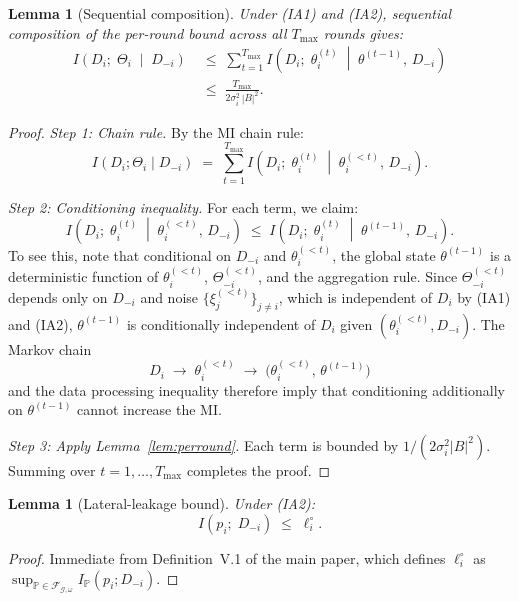 \documentclass[letterpaper,journal]{IEEEtran}
\newtheorem{lemma}[theorem]{Lemma}
\newcommand{\TOPO}{\mathcal{G}}
\newcommand{\FAM}{\mathcal{F}}
\newcommand{\Tmax}{T_{\max}}
\begin{document}
\begin{lemma}[Sequential composition]
\label{lem:composition}
Under (IA1) and (IA2), sequential composition of the per-round
bound across all $\Tmax$ rounds gives:
\begin{align*}
I\!\left(D_i;\;\Theta_i \;\middle|\; D_{-i}\right)
&\;\leq\;
\sum_{t=1}^{\Tmax}
I\!\left(D_i;\;\theta_i^{(t)} \;\middle|\;
\theta^{(t-1)},\,D_{-i}\right) \\
&\;\leq\;
\frac{\Tmax}{2\sigma_i^2\,|B|^2}.
\end{align*}
\end{lemma}

\begin{proof}
\textit{Step 1: Chain rule.} By the MI chain rule:
\[
I(D_i;\Theta_i \mid D_{-i})
\;=\; \sum_{t=1}^{\Tmax}
I\!\left(D_i;\;\theta_i^{(t)} \;\middle|\;
\theta_i^{(<t)},\,D_{-i}\right).
\]

\noindent\textit{Step 2: Conditioning inequality.}
For each term, we claim:
\[
I\!\left(D_i;\;\theta_i^{(t)} \;\middle|\;
\theta_i^{(<t)},\,D_{-i}\right)
\;\leq\;
I\!\left(D_i;\;\theta_i^{(t)} \;\middle|\;
\theta^{(t-1)},\,D_{-i}\right).
\]
To see this, note that conditional on $D_{-i}$ and
$\theta_i^{(<t)}$, the global state $\theta^{(t-1)}$ is a
deterministic function of $\theta_i^{(<t)}$,
$\Theta_{-i}^{(<t)}$, and the aggregation rule. Since
$\Theta_{-i}^{(<t)}$ depends only on $D_{-i}$ and noise
$\{\xi_j^{(<t)}\}_{j \neq i}$, which is independent of $D_i$
by (IA1) and (IA2), $\theta^{(t-1)}$ is conditionally
independent of $D_i$ given $(\theta_i^{(<t)}, D_{-i})$.
The Markov chain
\[
D_i \;\longrightarrow\; \theta_i^{(<t)}
\;\longrightarrow\;
\bigl(\theta_i^{(<t)},\,\theta^{(t-1)}\bigr)
\]
and the data processing inequality therefore imply that
conditioning additionally on $\theta^{(t-1)}$ cannot increase
the MI.

\medskip
\noindent\textit{Step 3: Apply Lemma~\ref{lem:perround}.}
Each term is bounded by $1/(2\sigma_i^2|B|^2)$. Summing
over $t = 1, \ldots, \Tmax$ completes the proof.
\end{proof}

\begin{lemma}[Lateral-leakage bound]
\label{lem:lateral}
Under (IA2):
\[
I\!\left(p_i;\;D_{-i}\right) \;\leq\; \ell_i^\circ.
\]
\end{lemma}

\begin{proof}
Immediate from Definition~V.1 of the main paper, which defines
$\ell_i^\circ$ as $\sup_{\mathbb{P} \in \FAM_{\TOPO,\omega}}
I_{\mathbb{P}}(p_i; D_{-i})$.
\end{proof}
\end{document}

